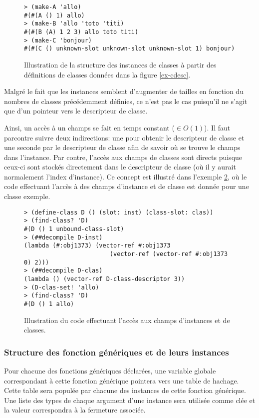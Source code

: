 \documentclass[letterpaper,12pt]{book}
\begin{document}
      \begin{figure}[h!]
        \begin{lstlisting}
> (make-A 'allo)
#(#(A () 1) allo)
> (make-B 'allo 'toto 'titi)
#(#(B (A) 1 2 3) allo toto titi)
> (make-C 'bonjour)
#(#(C () unknown-slot unknown-slot unknown-slot 1) bonjour)
        \end{lstlisting}
        \caption{Illustration de la structure des instances de classes à
          partir des définitions de classes données dans la figure
          \ref{ex-cdesc}.}
        \label{ex-struct-inst}
      \end{figure}

      Malgré le fait que les instances semblent d'augmenter de tailles
      en fonction du nombres de classes précédemment définies, ce n'est
      pas le cas puisqu'il ne s'agit que d'un pointeur vers le
      descripteur de classe.

      Ainsi, un accès à un champs se fait en temps constant ($\in
      O(1)$). Il faut parcontre suivre deux indirections: une pour
      obtenir le descripteur de classe et une seconde par le
      descripteur de classe afin de savoir où se trouve le champs dans
      l'instance. Par contre, l'accès aux champs de classes sont
      directs puisque ceux-ci sont stockés directement dans le
      descripteur de classe (où il y aurait normalement l'index
      d'instance). Ce concept est illustré dans l'exemple
      \ref{ex-slot-access}, où le code effectuant l'accès à des champs
      d'instance et de classe est donnée pour une classe exemple.

      \begin{figure}[h!]
        \begin{lstlisting}
> (define-class D () (slot: inst) (class-slot: clas))
> (find-class? 'D)
#(D () 1 unbound-class-slot)
> (##decompile D-inst)
(lambda (#:obj1373) (vector-ref #:obj1373 
                        (vector-ref (vector-ref #:obj1373 0) 2)))
> (##decompile D-clas)
(lambda () (vector-ref D-class-descriptor 3))
> (D-clas-set! 'allo)
> (find-class? 'D)
#(D () 1 allo)
        \end{lstlisting}
        \caption{Illustration du code effectuant l'accès aux champs
          d'instances et de classes.}
        \label{ex-slot-access}
      \end{figure}

    \subsubsection{Structure des fonction génériques et de leurs instances}
      \label{genfun-struct}
      Pour chacune des fonctions génériques déclarées, une variable
      globale correspondant à cette fonction générique pointera vers
      une table de hachage. Cette table sera populée par chacune des
      instances de cette fonction générique. Une liste des types de
      chaque argument d'une instance sera utilisée comme clée et la
      valeur correspondra à la fermeture associée.
\end{document}
